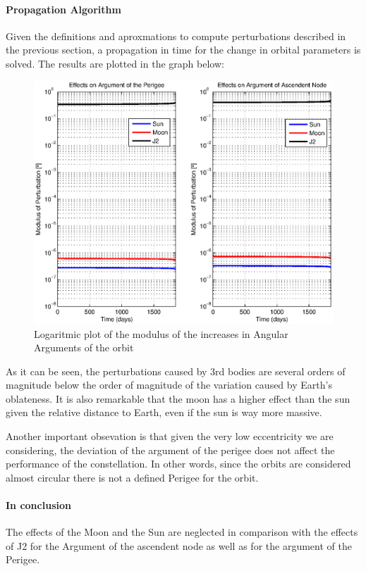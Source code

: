 \paragraph{Propagation Algorithm\\}
Given the definitions and aproxmations to compute perturbations described in the previous section, a propagation in time for the change in orbital parameters is solved. The results are plotted in the graph below:

\begin{figure}[H]
\centering
\includegraphics[scale=0.8]{SignificativePerturbations/ModulusAngulars.eps}
\caption{Logaritmic plot of the modulus of the increases in Angular Arguments of the orbit}
\end{figure}

As it can be seen, the perturbations caused by 3rd bodies are several orders of magnitude below the order of magnitude of the variation caused by Earth's oblateness. It is also remarkable that the moon has a higher effect than the sun given the relative distance to Earth, even if the sun is way more massive.

Another important obsevation is that given the very low eccentricity we are considering, the deviation of the argument of the perigee does not affect the performance of the constellation. In other words, since the orbits are considered almost circular there is not a defined Perigee for the orbit.

\paragraph{In conclusion\\}
The effects of the Moon and the Sun are neglected in comparison with the effects of J2 for the Argument of the ascendent node as well as for the argument of the Perigee.